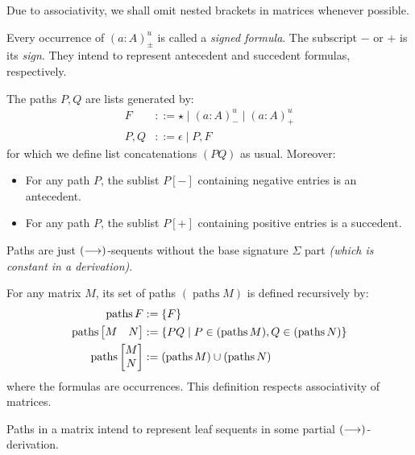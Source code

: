 \documentclass[twoside]{report}
\begin{document}
Due to associativity, we shall omit nested brackets in matrices whenever possible.

Every occurrence of $(a : A)^u_{\pm}$ is called a \emph{signed formula}. The subscript $-$ or $+$ is its \emph{sign}. They intend to represent antecedent and succedent formulas, respectively.

\begin{definition}[Paths]
    \label{def:matrix_paths}
    The paths $P, Q$ are lists generated by:
    $$
        \begin{aligned}
            F    & ::= \star \mid (a : A)^u_- \mid (a : A)^u_+ \\
            P, Q & ::= \epsilon \mid P, F
        \end{aligned}
    $$
    for which we define list concatenations $(PQ)$ as usual. Moreover:
    \begin{itemize}[noitemsep]
        \item For any path $P$, the sublist $P[-]$ containing negative entries is an antecedent.
        \item For any path $P$, the sublist $P[+]$ containing positive entries is a succedent.
    \end{itemize}
\end{definition}

Paths are just $(\longrightarrow)$-sequents without the base signature $\Sigma$ part \emph{(which is constant in a derivation)}.

\newcommand{\paths}{\operatorname{paths}}

\begin{definition}
    \label{def:matrix_path_set}
    For any matrix $M$, its set of paths $(\paths M)$ is defined recursively by:
    $$
        \begin{aligned}
            \paths F            & \defeq \{F\}                                          \\
            \paths \mat{M & N}  & \defeq \{PQ \mid P \in (\paths M), Q \in (\paths N)\} \\
            \paths \mat{M \\ N} & \defeq (\paths M) \cup (\paths N)                     \\
        \end{aligned}
    $$
    where the formulas are occurrences. This definition respects associativity of matrices.
\end{definition}

Paths in a matrix intend to represent leaf sequents in some partial $(\longrightarrow)$-derivation.
\end{document}
